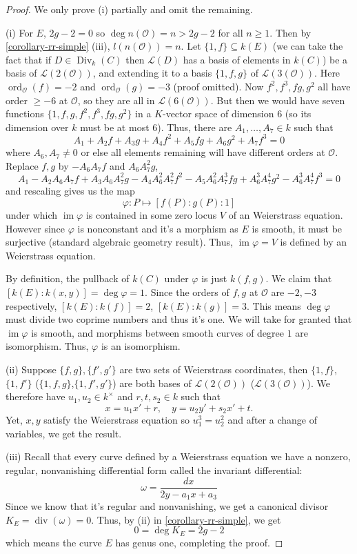 \documentclass[12pt]{article}
\theoremstyle{remark}
\theoremstyle{definition}
\newcommand{\ord}[0]{\operatorname{ord}}
\newcommand{\w}[0]{\omega}
\newcommand{\ecO}[0]{\mathcal O}
\newcommand{\im}[0]{\operatorname{im}}
\newcommand{\Div}[0]{\operatorname{Div}}
\newcommand{\pdiv}[0]{\operatorname{div}}
\begin{document}
        \begin{proof}
            We only prove (i) partially and omit the remaining.
            
            (i) For $E$, $2g-2=0$ so $\deg n(\mathcal O)=n>2g-2$ for all $n\geqslant 1$. Then by \autoref{corollary-rr-simple} (iii), $l(n(\mathcal O))=n$. Let $\{1, f\}\subseteq k(E)$ (we can take the fact that if $D\in\Div_k(C)$ then $\mathcal L(D)$ has a basis of elements in $k(C)$) be a basis of $\mathcal L(2(\mathcal O))$, and extending it to a basis $\{1,f,g\}$ of $\mathcal L(3(\mathcal O))$. Here $\ord_{\mathcal O}(f)=-2$ and $\ord_{\mathcal O}(g)=-3$ (proof omitted). Now $f^2, f^3, fg, g^2$ all have order $\geqslant -6$ at $\mathcal O$, so they are all in $\mathcal L(6(\mathcal O))$. But then we would have seven functions $\{1,f,g,f^2,f^3,fg,g^2\}$ in a $K$-vector space of dimension $6$ (so its dimension over $k$ must be at most $6$). Thus, there are $A_1,\dots, A_7\in k$ such that
            \[A_1+A_2f+A_3g+A_4f^2+A_5fg+A_6g^2+A_7f^3=0\]
            where $A_6,A_7\neq 0$ or else all elements remaining will have different orders at $\mathcal O$. Replace $f,g$ by $-A_6A_7f$ and $A_6A_7^2g$,
            \[A_1-A_2A_6A_7f+A_3A_6A_7^2g-A_4A_6^2A_7^2f^2-A_5A_6^2A_7^3fg+A_6^3A_7^4g^2-A_6^3A_7^4f^3=0\]
            and rescaling gives us the map
            \[\varphi:P\mapsto[f(P):g(P):1]\]
            under which $\im \varphi$ is contained in some zero locus $V$ of an Weierstrass equation. However since $\varphi$ is nonconstant and it's a morphism as $E$ is smooth, it must be surjective (standard algebraic geometry result). Thus, $\im \varphi=V$ is defined by an Weierstrass equation.
            
            By definition, the pullback of $k(C)$ under $\varphi$ is just $k(f, g)$. We claim that $[k(E):k(x, y)]=\deg \varphi=1$. Since the orders of $f, g$ at $\mathcal O$ are $-2,-3$ respectively, $[k(E):k(f)]=2$, $[k(E):k(g)]=3$. This means $\deg\varphi$ must divide two coprime numbers and thus it's one. We will take for granted that $\im\varphi$ is smooth, and morphisms between smooth curves of degree $1$ are isomorphism. Thus, $\varphi$ is an isomorphism.
            
            (ii) Suppose $\{f,g\},\{f',g'\}$ are two sets of Weierstrass coordinates, then $\{1,f\}$, $\{1,f'\}$ ($\{1,f,g\}$,$\{1,f',g'\}$) are both bases of $\mathcal L(2(\ecO))$ ($\mathcal L(3(\ecO))$). We therefore have $u_1,u_2\in k^\times$ and $r, t, s_2\in k$ such that 
            \[x=u_1x'+r,\quad y=u_2y'+s_2x'+t.\]
            Yet, $x, y$ satisfy the Weierstrass equation so $u_1^3=u_2^2$ and after a change of variables, we get the result.
            
            (iii) Recall that every curve defined by a Weierstrass equation we have a nonzero, regular, nonvanishing differential form called the invariant differential:
            \[\w=\frac{dx}{2y-a_1x+a_3}\]
            Since we know that it's regular and nonvanishing, we get a canonical divisor $K_E=\pdiv(\w)=0$. Thus, by (ii) in \autoref{corollary-rr-simple}, we get
            \[0=\deg K_E=2g-2\]
            which means the curve $E$ has genus one, completing the proof.
        \end{proof}
        
\end{document}
